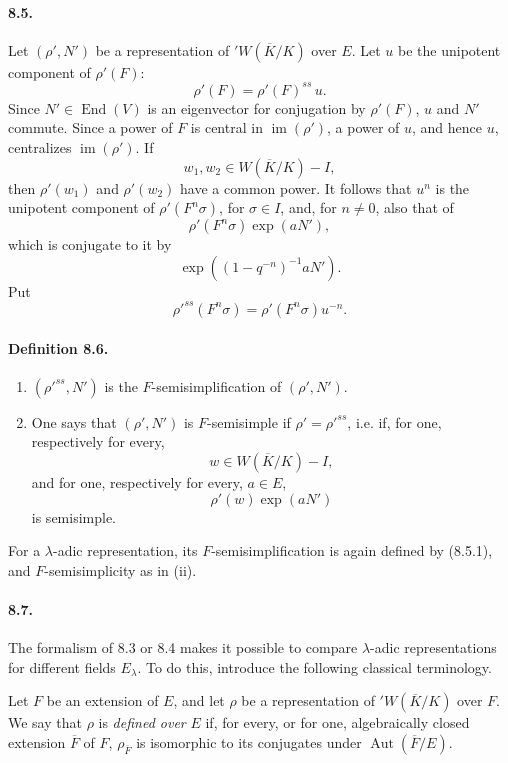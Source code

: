 \documentclass[10pt,letterpaper]{article}
\providecommand{\im}{\operatorname{im}}
\providecommand{\Aut}{\operatorname{Aut}}
\providecommand{\End}{\operatorname{End}}
\providecommand{\im}{\operatorname{im}}
\providecommand{\im}{\operatorname{im}}
\providecommand{\End}{\operatorname{End}}
\begin{document}
\paragraph{8.5.} Let \((\rho',N')\) be a representation of \({}'W(\overline K/K)\) over \(E\). Let \(u\) be the unipotent component of \(\rho'(F)\):
\[
\rho'(F)=\rho'(F)^{ss}\,u.
\]
Since \(N'\in\End(V)\) is an eigenvector for conjugation by \(\rho'(F)\), \(u\) and \(N'\) commute. Since a power of \(F\) is central in \(\im(\rho')\), a power of \(u\), and hence \(u\), centralizes \(\im(\rho')\). If
\[
w_1,w_2\in W(\overline K/K)-I,
\]
then \(\rho'(w_1)\) and \(\rho'(w_2)\) have a common power. It follows that \(u^n\) is the unipotent component of \(\rho'(F^n\sigma)\), for \(\sigma\in I\), and, for \(n\ne0\), also that of
\[
\rho'(F^n\sigma)\exp(aN'),
\]
which is conjugate to it by
\[
\exp((1-q^{-n})^{-1}aN').
\]
Put
\[
\tag{8.5.1}
\rho'^{ss}(F^n\sigma)=\rho'(F^n\sigma)u^{-n}.
\]

\paragraph{Definition 8.6.}
\begin{enumerate}[label=(\roman*)]
\item \((\rho'^{ss},N')\) is the \(F\)-semisimplification of \((\rho',N')\).
\item One says that \((\rho',N')\) is \(F\)-semisimple if \(\rho'=\rho'^{ss}\), i.e. if, for one, respectively for every,
\[
w\in W(\overline K/K)-I,
\]
and for one, respectively for every, \(a\in E\),
\[
\rho'(w)\exp(aN')
\]
is semisimple.
\end{enumerate}
For a \(\lambda\)-adic representation, its \(F\)-semisimplification is again defined by (8.5.1), and \(F\)-semisimplicity as in (ii).

\paragraph{8.7.} The formalism of 8.3 or 8.4 makes it possible to compare \(\lambda\)-adic representations for different fields \(E_\lambda\). To do this, introduce the following classical terminology.

Let \(F\) be an extension of \(E\), and let \(\rho\) be a representation of \({}'W(\overline K/K)\) over \(F\). We say that \(\rho\) is \emph{defined over} \(E\) if, for every, or for one, algebraically closed extension \(\overline F\) of \(F\), \(\rho_{\overline F}\) is isomorphic to its conjugates under \(\Aut(\overline F/E)\).
\end{document}
